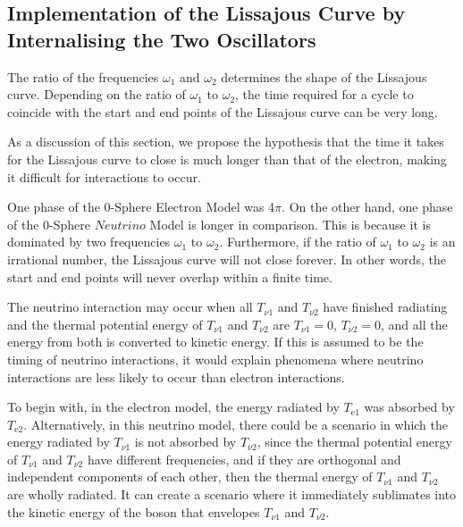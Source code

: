 \documentclass[%
 reprint,
 amsmath,amssymb,
 aps,
]{revtex4-1}
\numberwithin{equation}{section}%
\begin{document}
\subsection{Implementation of the Lissajous Curve by Internalising the Two Oscillators}


The ratio of the frequencies $\omega_{\mathrm{1}}$ and $\omega_{\mathrm{2}}$ determines the shape of the Lissajous curve. Depending on the ratio of $\omega_{\mathrm{1}}$ to $\omega_{\mathrm{2}}$, the time required for a cycle to coincide with the start and end points of the Lissajous curve can be very long.

As a discussion of this section, we propose the hypothesis that the time it takes for the Lissajous curve to close is much longer than that of the electron, making it difficult for interactions to occur.

One phase of the 0-Sphere Electron Model was 4$\pi$. On the other hand, one phase of the 0-Sphere $Neutrino$ Model is longer in comparison. This is because it is dominated by two frequencies $\omega_{\mathrm{1}}$ to $\omega_{\mathrm{2}}$. Furthermore, if the ratio of $\omega_{\mathrm{1}}$ to $\omega_{\mathrm{2}}$ is an irrational number, the Lissajous curve will not close forever. In other words, the start and end points will never overlap within a finite time.

The neutrino interaction may occur when all $T_{\nu \mathrm{1}}$ and $T_{\nu \mathrm{2}}$ have finished radiating and the thermal potential energy of $T_{\nu \mathrm{1}}$ and $T_{\nu \mathrm{2}}$ are $T_{\nu \mathrm{1}} = 0$, $T_{\nu \mathrm{2}} = 0$, and all the energy from both is converted to kinetic energy. If this is assumed to be the timing of neutrino interactions, it would explain phenomena where neutrino interactions are less likely to occur than electron interactions.

To begin with, in the electron model, the energy radiated by $T_{\mathrm{e1}}$ was absorbed by $T_{\mathrm{e2}}$. Alternatively, in this neutrino model, there could be a scenario in which the energy radiated by $T_{\nu \mathrm{1}}$ is not absorbed by $T_{\nu \mathrm{2}}$, since the thermal potential energy of $T_{\nu \mathrm{1}}$ and $T_{\nu \mathrm{2}}$ have different frequencies, and if they are orthogonal and independent components of each other, then the thermal energy of $T_{\nu \mathrm{1}}$ and $T_{\nu \mathrm{2}}$ are wholly radiated. It can create a scenario where it immediately sublimates into the kinetic energy of the boson that envelopes $T_{\nu \mathrm{1}}$ and $T_{\nu \mathrm{2}}$.
\end{document}
